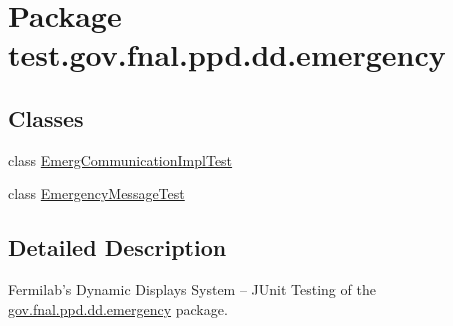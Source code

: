 \hypertarget{namespacetest_1_1gov_1_1fnal_1_1ppd_1_1dd_1_1emergency}{\section{Package test.\-gov.\-fnal.\-ppd.\-dd.\-emergency}
\label{namespacetest_1_1gov_1_1fnal_1_1ppd_1_1dd_1_1emergency}
}
\subsection*{Classes}
\begin{DoxyCompactItemize}
\item 
class \hyperlink{classtest_1_1gov_1_1fnal_1_1ppd_1_1dd_1_1emergency_1_1EmergCommunicationImplTest}{Emerg\-Communication\-Impl\-Test}
\item 
class \hyperlink{classtest_1_1gov_1_1fnal_1_1ppd_1_1dd_1_1emergency_1_1EmergencyMessageTest}{Emergency\-Message\-Test}
\end{DoxyCompactItemize}


\subsection{Detailed Description}
Fermilab's Dynamic Displays System -- J\-Unit Testing of the \hyperlink{namespacetest_1_1gov_1_1fnal_1_1ppd_1_1dd_1_1emergency}{gov.\-fnal.\-ppd.\-dd.\-emergency} package.